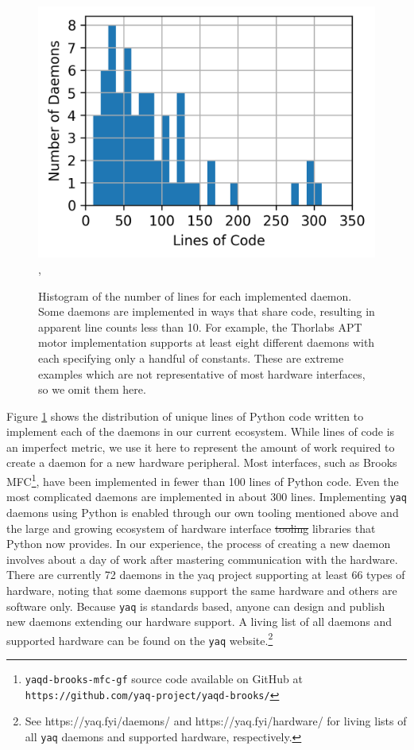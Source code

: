 \documentclass[aip, amsmath, amssymb, reprint,]{revtex4-2}
\newcommand\yaq{\texttt{yaq}}
\providecommand{\DIFdeltex}[1]{{\protect\color{red}\sout{#1}}}                      %
\providecommand{\DIFdelbegin}{} %
\providecommand{\DIFdelend}{} %
\providecommand{\DIFdel}[1]{\texorpdfstring{\DIFdeltex{#1}}{}} %
\newcommand{\DIFscaledelfig}{0.5}
\newlength{\DIFdelgraphicswidth} %
\newlength{\DIFdelgraphicsheight} %
\newcommand{\DIFdelincludegraphics}[2][]{%
\sbox{\DIFdelgraphicsbox}{\DIFOincludegraphics[#1]{#2}}%
\settoboxwidth{\DIFdelgraphicswidth}{\DIFdelgraphicsbox} %
\settoboxtotalheight{\DIFdelgraphicsheight}{\DIFdelgraphicsbox} %
\scalebox{\DIFscaledelfig}{%
\parbox[b]{\DIFdelgraphicswidth}{\usebox{\DIFdelgraphicsbox}\\[-\baselineskip] \rule{\DIFdelgraphicswidth}{0em}}\llap{\resizebox{\DIFdelgraphicswidth}{\DIFdelgraphicsheight}{%
\setlength{\unitlength}{\DIFdelgraphicswidth}%
\begin{picture}(1,1)%
\thicklines\linethickness{2pt} %
{\color[rgb]{1,0,0}\put(0,0){\framebox(1,1){}}}%
{\color[rgb]{1,0,0}\put(0,0){\line( 1,1){1}}}%
{\color[rgb]{1,0,0}\put(0,1){\line(1,-1){1}}}%
\end{picture}%
}\hspace*{3pt}}} %
} %
\DeclareRobustCommand{\DIFdelbegin}{\DIFOdelbegin \let\includegraphics\DIFdelincludegraphics} %
\DeclareRobustCommand{\DIFdelend}{\DIFOaddend \let\includegraphics\DIFOincludegraphics} %
\begin{document}
\begin{figure}
\includegraphics[width=\columnwidth]{figures/lines_histogram},
	\caption{  \label{fig:histogram} Histogram of the number of lines for each implemented daemon.
	Some daemons are implemented in ways that share code, resulting in apparent line counts less than 10.
	For example, the Thorlabs APT\cite{thorlabs_apt} motor implementation supports at least eight different daemons with each specifying only a handful of constants.
	These are extreme examples which are not representative of most hardware interfaces, so we omit them here.
	}
\end{figure}

Figure \ref{fig:histogram} shows the distribution of unique lines of Python code written to implement each of the daemons in our current ecosystem.
While lines of code is an imperfect metric, we use it here to represent the amount of work required to create a daemon for a new hardware peripheral.
Most interfaces, such as Brooks MFC\footnote{\texttt{yaqd-brooks-mfc-gf} source code available on GitHub at \texttt{https://github.com/yaq-project/yaqd-brooks/}}, have been implemented in fewer than 100 lines of Python code.
Even the most complicated daemons are implemented in about 300 lines.
Implementing \yaq{} daemons using Python is enabled through our own tooling mentioned above and the large and growing ecosystem of hardware interface \DIFdelbegin \DIFdel{tooling }\DIFdelend libraries that Python now provides\cite{pyserial, pyusb, pyvisa, pymodbus}.
In our experience, the process of creating a new daemon involves about a day of work after mastering communication with the hardware.
There are currently 72 daemons in the yaq project supporting at least 66 types of hardware, noting that some daemons support the same hardware and others are software only.
Because \yaq{} is standards based, anyone can design and publish new daemons extending our hardware support.
A living list of all daemons and supported hardware can be found on the \yaq{} website.\footnote{See https://yaq.fyi/daemons/ and https://yaq.fyi/hardware/ for living lists of all \yaq{} daemons and supported hardware, respectively.}
\end{document}
